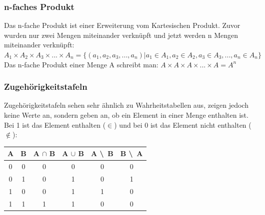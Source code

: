 \documentclass{article}
\begin{document}
	\subsubsection{n-faches Produkt}
	Das n-fache Produkt ist einer Erweiterung vom Kartesischen Produkt. Zuvor wurden nur zwei Mengen miteinander verknüpft und jetzt werden n Mengen miteinander verknüpft: $A_1\times A_2 \times A_3 \times ...\times A_n = \{(a_1, a_2, a_3,...,a_n)|a_1 \in A_1, a_2 \in A_2, a_3 \in A_3,...,a_n \in A_n\}$ \\
	Das n-fache Produkt einer Menge A schreibt man: $A\times A\times A\times...\times A = A^n$
	\subsubsection{Zugehörigkeitstafeln}
	Zugehörigkeitstafeln sehen sehr ähnlich zu Wahrheitstabellen aus, zeigen jedoch keine Werte an, sondern geben an, ob ein Element in einer Menge enthalten ist. Bei 1 ist das Element enthalten ($\in$) und bei 0 ist das Element nicht enthalten ($\notin$):\\
	\begin{tabular}{cccccc}
		\toprule
		A & B & A $\cap$ B & A $\cup$ B & A \textbackslash\, B & B \textbackslash\, A \\ \midrule
		0 & 0 & 0 & 0 & 0 & 0 \\ \hline
		0 & 1 & 0 & 1 & 0 & 1 \\ \hline
		1 & 0 & 0 & 1 & 1 & 0 \\ \hline
		1 & 1 & 1 & 1 & 0 & 0 \\
		\bottomrule
	\end{tabular}
\end{document}
